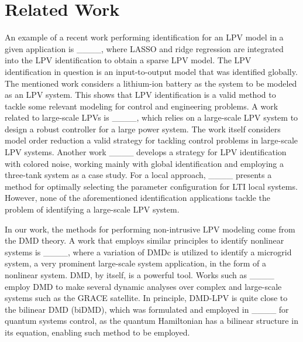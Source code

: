 \section{Related Work}
\label{sec:rel_work} 

An example of a recent work performing identification for an LPV model in a given application is ____, where LASSO and ridge regression are integrated into the LPV identification to obtain a sparse LPV model.
%
The LPV identification in question is an input-to-output model that was identified globally. The mentioned work considers a lithium-ion battery as the system to be modeled as an LPV system.
%
This shows that LPV identification is a valid method to tackle some relevant modeling for control and engineering problems.
%
A work related to large-scale LPVs is ____, which relies on a large-scale LPV system to design a robust controller for a large power system.
%
The work itself considers model order reduction a valid strategy for tackling control problems in large-scale LPV systems.
%
Another work ____ develops a strategy for LPV identification with colored noise, working mainly with global identification and employing a three-tank system as a case study.
%
For a local approach, ____ presents a method for optimally selecting the parameter configuration for LTI local systems.
%
However, none of the aforementioned identification applications tackle the problem of identifying a large-scale LPV system.


%
In our work, the methods for performing non-intrusive LPV modeling come from the DMD theory.
%
A work that employs similar principles to identify nonlinear systems is ____, where a variation of DMDc is utilized to identify a microgrid system, a very prominent large-scale system application, in the form of a nonlinear system.
%
DMD, by itself, is a powerful tool.
%
Works such as ____ employ DMD to make several dynamic analyses over complex and large-scale systems such as the GRACE satellite.
%
In principle, DMD-LPV is quite close to the bilinear DMD (biDMD), which was formulated and employed in ____ for quantum systems control, as the quantum Hamiltonian has a bilinear structure in its equation, enabling such method to be employed.


